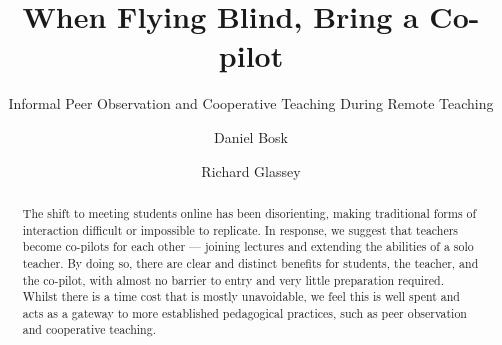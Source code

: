 \documentclass[sigconf,natbib=false]{acmart}
\begin{document}
\title{When Flying Blind, Bring a Co-pilot}
\subtitle{Informal Peer Observation and Cooperative Teaching During Remote Teaching}


\author{Daniel Bosk}
\orcid{}

\author{Richard Glassey}
\orcid{}
\fancyhead{}


\begin{abstract}

The shift to meeting students online has been disorienting, making traditional 
forms of interaction difficult or impossible to replicate. In response, we 
suggest that teachers become co-pilots for each other --- joining lectures and 
extending the abilities of a solo teacher. By doing so, there are clear and 
distinct benefits for students, the teacher, and the co-pilot, with almost no 
barrier to entry and very little preparation required. Whilst there is a time 
cost that is mostly unavoidable, we feel this is well spent and acts as a 
gateway to more established pedagogical practices, such as peer observation and 
cooperative teaching.

\end{abstract}

\begin{CCSXML}

\end{CCSXML}
\end{document}
